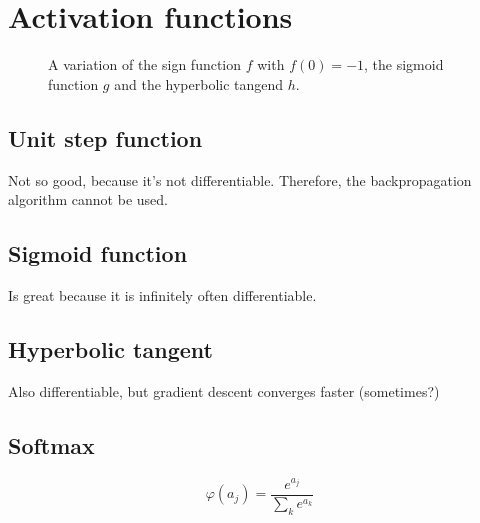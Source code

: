 \section{Activation functions}
\begin{figure}[ht]
    \caption{A variation of the sign function $f$ with $f(0) = -1$, the sigmoid function $g$ and the hyperbolic tangend $h$.}
    \label{fig:logistic-function}
\end{figure}

\subsection{Unit step function}\label{f:unitstep}
Not so good, because it's not differentiable. Therefore, the backpropagation
algorithm cannot be used.

\subsection{Sigmoid function}\label{f:sigmoid}
Is great because it is infinitely often differentiable.


\subsection{Hyperbolic tangent}\label{f:tanh}
Also differentiable, but gradient descent converges faster (sometimes?)

\subsection{Softmax}\label{f:softmax}

\[\varphi(a_j) = \frac{e^{a_j}}{\sum_k e^{a_k}}\]